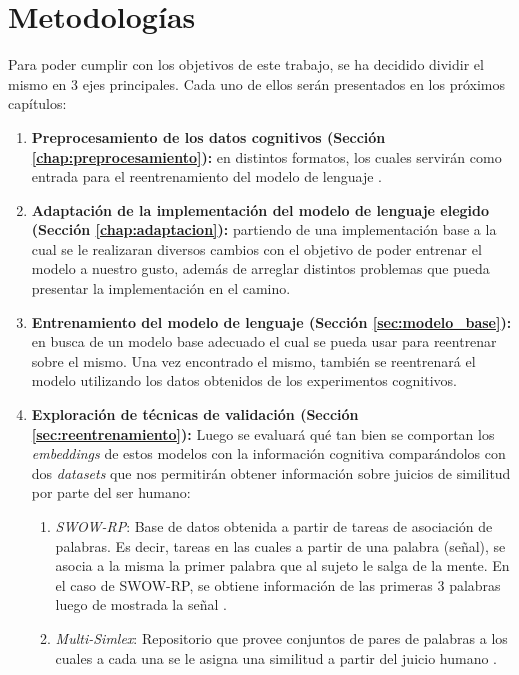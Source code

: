 \chapter{Metodologías}

Para poder cumplir con los objetivos de este trabajo, se ha decidido dividir el mismo en 3 ejes principales. Cada uno de ellos serán presentados en los próximos capítulos:

\begin{enumerate}
    \item \textbf{Preprocesamiento de los datos cognitivos (Sección \ref{chap:preprocesamiento}):} en distintos formatos, los cuales servirán como entrada para el reentrenamiento del modelo de lenguaje .
    \item \textbf{Adaptación de la implementación del modelo de lenguaje elegido (Sección \ref{chap:adaptacion}):} partiendo de una implementación base a la cual se le realizaran diversos cambios con el objetivo de poder entrenar el modelo a nuestro gusto, además de arreglar distintos problemas que pueda presentar la implementación en el camino.
    \item \textbf{Entrenamiento del modelo de lenguaje (Sección \ref{sec:modelo_base}):} en busca de un modelo base adecuado el cual se pueda usar para reentrenar sobre el mismo. Una vez encontrado el mismo, también se reentrenará el modelo utilizando los datos obtenidos de los experimentos cognitivos. 
    \item \textbf{Exploración de técnicas de validación (Sección \ref{sec:reentrenamiento}):} Luego se evaluará qué tan bien se comportan los \textit{embeddings} de estos modelos con la información cognitiva comparándolos con dos \textit{datasets} que nos permitirán obtener información sobre juicios de similitud por parte del ser humano:
    \begin{enumerate}
        \item \textit{SWOW-RP}: Base de datos obtenida a partir de tareas de asociación de palabras. Es decir, tareas en las cuales a partir de una palabra (señal), se asocia a la misma la primer palabra que al sujeto le salga de la mente. En el caso de SWOW-RP, se obtiene información de las primeras 3 palabras luego de mostrada la señal \parencite{Cabana2023}.
        \item \textit{Multi-Simlex}: Repositorio que provee conjuntos de pares de palabras a los cuales a cada una se le asigna una similitud a partir del juicio humano \parencite{Vulic2020}.
    \end{enumerate}
\end{enumerate}